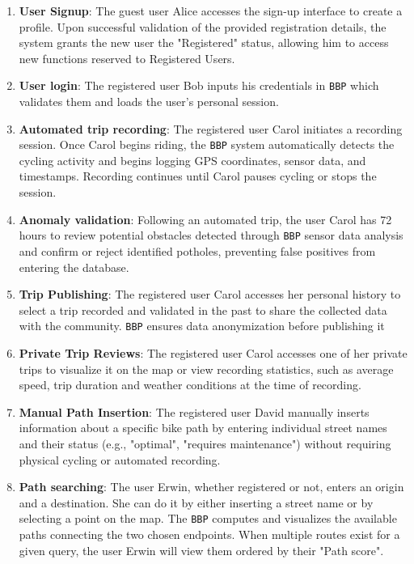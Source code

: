 \begin{enumerate}
    \item \textbf{User Signup}: The guest user Alice accesses the sign-up interface to create a profile. Upon successful validation of the provided registration details, the system grants the new user the "Registered" status, allowing him to access new functions reserved to Registered Users.

    \item \textbf{User login}: The registered user Bob inputs his credentials in \texttt{BBP} which validates them and loads the user's personal session.

    \item \textbf{Automated trip recording}: The registered user Carol initiates a recording session. Once Carol begins riding, the \texttt{BBP} system automatically detects the cycling activity and begins logging GPS coordinates, sensor data, and timestamps. Recording continues until Carol pauses cycling or stops the session.
    
    \item \textbf{Anomaly validation}: Following an automated trip, the user Carol has 72 hours to review potential obstacles detected through \texttt{BBP} sensor data analysis and confirm or reject identified potholes, preventing false positives from entering the database.

    \item \textbf{Trip Publishing}: The registered user Carol accesses her personal history to select a trip recorded and validated in the past to share the collected data with the community. \texttt{BBP} ensures data anonymization before publishing it

    \item \textbf{Private Trip Reviews}: The registered user Carol accesses one of her private trips to visualize it on the map or view recording statistics, such as average speed, trip duration and weather conditions at the time of recording.

    \item \textbf{Manual Path Insertion}: The registered user David manually inserts information about a specific bike path by entering individual street names and their status (e.g., "optimal", "requires maintenance") without requiring physical cycling or automated recording.

    \item \textbf{Path searching}: The user Erwin, whether registered or not, enters an origin and a destination. She can do it by either inserting a street name or by selecting a point on the map. The \texttt{BBP} computes and visualizes the available paths connecting the two chosen endpoints. When multiple routes exist for a given query, the user Erwin will view them ordered by their "Path score".


\end{enumerate}
